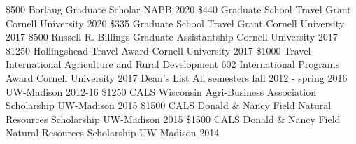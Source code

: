 
\begin{cvhonors}
  \cvhonor
    {\$500} %
    {Borlaug Graduate Scholar} %
    {NAPB} %
    {2020} %
  \cvhonor
    {\$440} %
    {Graduate School Travel Grant} %
    {Cornell University} %
    {2020} %
\cvhonor
    {\$335} %
    {Graduate School Travel Grant} %
    {Cornell University} %
    {2017} %
\cvhonor
    {\$500} %
    {Russell R. Billings Graduate Assistantship} %
    {Cornell University} %
    {2017} %
\cvhonor
    {\$1250} %
    {Hollingshead Travel Award} %
    {Cornell University} %
    {2017} %
\cvhonor
    {\$1000} %
    {Travel International Agriculture and Rural Development 602 International Programs Award} %
    {Cornell University} %
    {2017} %
\cvhonor
    {Dean's List} %
    {All semesters fall 2012 - spring 2016} %
    {UW-Madison} %
    {2012-16} %
\cvhonor
    {\$1250} %
    {CALS Wisconsin Agri-Business Association Scholarship} %
    {UW-Madison} %
    {2015} %
\cvhonor
    {\$1500} %
    {CALS Donald \& Nancy Field Natural Resources Scholarship} %
    {UW-Madison} %
    {2015} %
\cvhonor
    {\$1500} %
    {CALS Donald \& Nancy Field Natural Resources Scholarship} %
    {UW-Madison} %
    {2014} %

\end{cvhonors}
